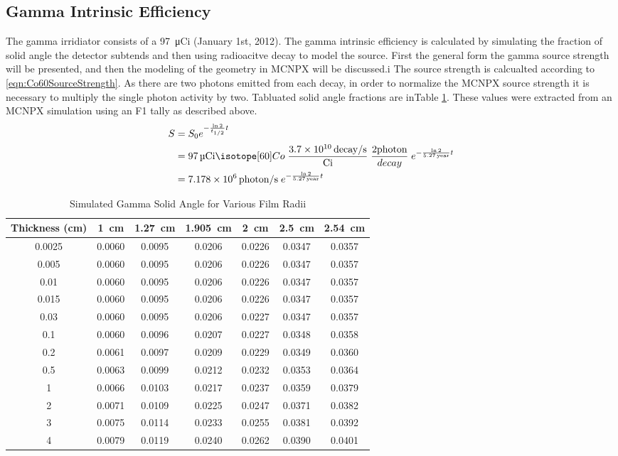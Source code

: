 \documentclass[draftcls,onecolumn]{IEEEtran}
\begin{document}
\subsection{Gamma Intrinsic Efficiency}
The gamma irridiator consists of a \SI{97}{\micro Ci}  (January 1st, 2012).
The gamma intrinsic efficiency is calculated by simulating the fraction of solid angle the detector subtends and then using radioacitve decay to model the  source.
First the general form the gamma source strength will be presented, and then the modeling of the geometry in MCNPX will be discussed.i
The  source strength is calcualted according to \eqref{eqn:Co60SourceStrength}. 
As there are two photons emitted from each  decay, in order to normalize the MCNPX source strength it is necessary to multiply the single photon activity by two.
Tabluated solid angle fractions are inTable \ref{tab:GammaSolidAngle}.
These values were extracted from an MCNPX simulation using an F1 tally as described above.
\begin{align}
  \label{eqn:Co60SourceStrength}
  S &= S_0 e^{-\frac{\ln{2}}{t_{1/2}} t} \\ \notag 
    &= \SI{97}{\micro Ci} \iso[60]{Co}\; \frac{\SI{3.7E10}{decay\per\second}}{\si{Ci}} \;\frac{2\text{photon}}{decay}\;e^{-\frac{ \ln{2}}{\SI{5.27}{year}}t}  \\ \notag
    &= \SI{7.178E6}{photon\per\second}\;e^{-\frac{ \ln{2}}{\SI{5.27}{year}}t} 
\end{align}
\begin{table}
	\centering
	\caption{Simulated Gamma Solid Angle for Various Film Radii}
	\label{tab:GammaSolidAngle}
	\begin{tabular}{c | c c c c c c}
Thickness (\si{\cm})	&	\SI{1}{\cm}	&	\SI{1.27}{\cm}	&	\SI{1.905}{\cm}	&	\SI{2}{\cm}	&	\SI{2.5}{\cm}	&	\SI{2.54}{\cm} \\ \hline
0.0025	&	0.0060	&	0.0095	&	0.0206	&	0.0226	&	0.0347	&	0.0357\\
0.005	&	0.0060	&	0.0095	&	0.0206	&	0.0226	&	0.0347	&	0.0357\\
0.01	&	0.0060	&	0.0095	&	0.0206	&	0.0226	&	0.0347	&	0.0357\\
0.015	&	0.0060	&	0.0095	&	0.0206	&	0.0226	&	0.0347	&	0.0357\\
0.03	&	0.0060	&	0.0095	&	0.0206	&	0.0227	&	0.0347	&	0.0357\\
0.1	&	0.0060	&	0.0096	&	0.0207	&	0.0227	&	0.0348	&	0.0358\\
0.2	&	0.0061	&	0.0097	&	0.0209	&	0.0229	&	0.0349	&	0.0360\\
0.5	&	0.0063	&	0.0099	&	0.0212	&	0.0232	&	0.0353	&	0.0364\\
1	&	0.0066	&	0.0103	&	0.0217	&	0.0237	&	0.0359	&	0.0379\\
2	&	0.0071	&	0.0109	&	0.0225	&	0.0247	&	0.0371	&	0.0382\\
3	&	0.0075	&	0.0114	&	0.0233	&	0.0255	&	0.0381	&	0.0392\\
4	&	0.0079	&	0.0119	&	0.0240	&	0.0262	&	0.0390	&	0.0401\\
	\end{tabular}
\end{table}
\end{document}
